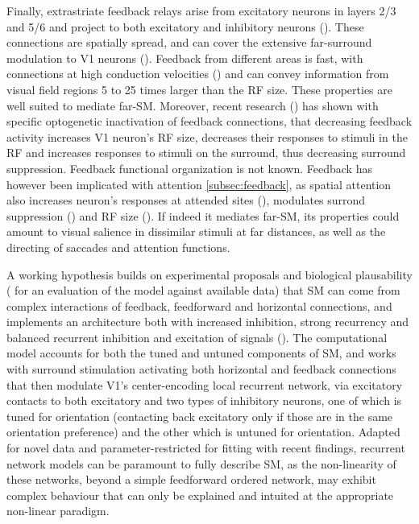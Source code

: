 Finally, extrastriate feedback relays arise from excitatory neurons in layers 2/3 and 5/6 and project to both excitatory and inhibitory neurons (\cite{Anderson2009}). These connections are spatially spread, and can cover the extensive far-surround modulation to V1 neurons (\cite{Angelucci2002}). Feedback from different areas is fast, with connections at high conduction velocities (\cite{Girard2001}) and can convey information from visual field regions 5 to 25 times larger than the RF size. These properties are well suited to mediate far-SM. Moreover, recent research (\cite{Nurminem2018}) has shown with specific optogenetic inactivation of feedback connections, that decreasing feedback activity increases V1 neuron's RF size, decreases their responses to stimuli in the RF and increases responses to stimuli on the surround, thus decreasing surround suppression. Feedback functional organization is not known. Feedback has however been implicated with attention \ref{subsec:feedback}, as spatial attention also increases neuron's responses at attended sites (\cite{McAdams2005}), modulates surrond suppression (\cite{Sundberg2009}) and RF size (\cite{Roberts2007}). If indeed it mediates far-SM, its properties could amount to visual salience in dissimilar stimuli at far distances, as well as the directing of saccades and attention functions. 

A working hypothesis \cite{Schwabe2006} builds on experimental proposals and biological plausability (\cite{Angelucci2017} for an evaluation of the model against available data) that SM can come from complex interactions of feedback, feedforward and horizontal connections, and implements an architecture both with increased inhibition, strong recurrency and balanced recurrent inhibition and excitation of signals (\cite{Shushruth2012}). The computational model accounts for both the tuned and untuned components of SM, and works with surround stimulation activating both horizontal and feedback connections that then modulate V1's center-encoding local recurrent network, via excitatory contacts to both excitatory and two types of inhibitory neurons, one of which is tuned for orientation (contacting back excitatory only if those are in the same orientation preference) and the other which is untuned for orientation. Adapted for novel data and parameter-restricted for fitting with recent findings, recurrent network models can be paramount to fully describe SM, as the non-linearity of these networks, beyond a simple feedforward ordered network, may exhibit complex behaviour that can only be explained and intuited at the appropriate non-linear paradigm.

